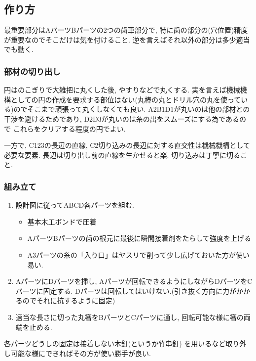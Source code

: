 \documentclass{jarticle}
\begin{document}
\subsection{作り方}
最重要部分はAパーツBパーツの2つの歯車部分で, 特に歯の部分の(穴位置)精度が重要なのでそこだけは気を付けること.
逆を言えばそれ以外の部分は多少適当でも動く.

\subsubsection{部材の切り出し}



円はのこぎりで大雑把に丸くした後, やすりなどで丸くする.
実を言えば機械機構としての円の作成を要求する部位はない(丸棒の丸とドリル穴の丸を使っている)のでそこまで頑張って丸くしなくても良い.
A2B1D1が丸いのは他の部材との干渉を避けるためであり, D2D3が丸いのは糸の出をスムーズにする為であるので
これらをクリアする程度の円でよい.

一方で, C123の長辺の直線, C2切り込みの長辺に対する直交性は機械機構として必要な要素.
長辺は切り出し前の直線を生かせると楽. 切り込みは丁寧に切ること.



\subsubsection{組み立て}
\begin{enumerate}
\item
	設計図に従ってABCD各パーツを組む.
	\begin{itemize}
	\item 基本木工ボンドで圧着
	\item AパーツBパーツの歯の根元に最後に瞬間接着剤をたらして強度を上げる
	\item A3パーツの糸の「入り口」はヤスリで削って少し広げておいた方が使い易い.
	\end{itemize}
\item
	AパーツにDパーツを挿し, Aパーツが回転できるようにしながらDパーツをCパーツに固定する.
	Dパーツは回転してはいけない.(引き抜く方向に力がかかるのでそれに抗するように固定)
\item
	適当な長さに切った丸箸をBパーツとCパーツに通し,
	回転可能な様に箸の両端を止める.
\end{enumerate}
各パーツどうしの固定は接着しない木釘(というか竹串釘)
を用いるなど取り外し可能な様にできればその方が使い勝手が良い.
\end{document}
